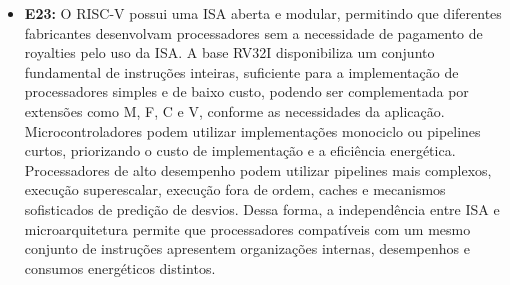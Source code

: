 \documentclass[12pt,a4paper,titlepage]{article}
\begin{document}
\begin{itemize}
    \item\textbf{E23:}
        O RISC-V possui uma ISA aberta e modular, permitindo que diferentes fabricantes desenvolvam processadores sem a
        necessidade de pagamento de royalties pelo uso da ISA.
        A base RV32I disponibiliza um conjunto fundamental de instruções inteiras, suficiente para a implementação de
        processadores simples e de baixo custo, podendo ser complementada por extensões como M, F, C e V, conforme
        as necessidades da aplicação.
        Microcontroladores podem utilizar implementações monociclo ou pipelines curtos, priorizando o custo de implementação
        e a eficiência energética. Processadores de alto desempenho podem utilizar pipelines mais complexos, execução
        superescalar, execução fora de ordem, caches e mecanismos sofisticados de predição de desvios.
        Dessa forma, a independência entre ISA e microarquitetura permite que processadores compatíveis com um mesmo
        conjunto de instruções apresentem organizações internas, desempenhos e consumos energéticos distintos.
\end{itemize}
\end{document}
